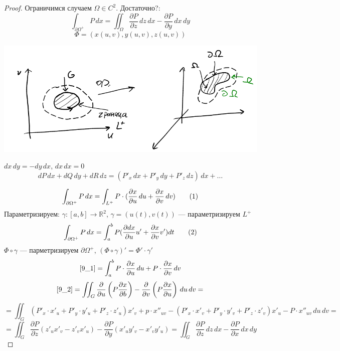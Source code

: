 \documentclass[oneside]{book}
\newcommand\addtag{\refstepcounter{equation}\tag{\theequation}}
\newcommand{\R}{\mathbb{R}}
\theoremstyle{plain}
\theoremstyle{remark}
\theoremstyle{definition}
\begin{document}
\begin{proof}
Ограничимся случаем \(\Omega \in C^2\). Достаточно?:
\[ \int_{\partial \Omega^+} P\,dx = \iint_\Omega\frac{\partial P}{\partial z}\,dz\,dx  - \frac{\partial P}{\partial y}\,dx\,dy \]
\[ \Phi = (x(u, v), y(u, v), z(u, v)) \]
\begin{center}
\includegraphics[scale=0.5]{9_3.png}
\end{center}
\color{blue}
\(dx\,dy = - dy\,dx\), \(dx\,dx = 0\)
\[ dP\,dx + dQ\,dy + dR\,dz = (P'_x\,dx + P'_y\,dy + P'_z\,dz)\,dx + \dots \]

\color{black}
\[ \int_{\partial \Omega^+} P\,dx = \int_{L^+} P\cdot (\frac{\partial x}{\partial u}\,du + \frac{\partial x}{\partial v}\,dv) \addtag\label{9_2} \]
\color{blue}
Параметризируем: \(\gamma: [a, b] \to \R^2\), \(\gamma = (u(t), v(t))\) --- параметризируем \(L^+\)
\[ \int_{\partial \Omega^+} P\,dx = \int_a^b P(\frac{\partial dx}{\partial u}u' + \frac{\partial x}{\partial v}v')dt \addtag\label{9_1}\]
\(\Phi \circ \gamma\) --- парметризируем \(\partial \Omega^+\), \((\Phi \circ \gamma)' = \Phi' \cdot \gamma'\)
\[ \ref{9_1} = \int_a^b P\cdot\frac{\partial x}{\partial u}\,du + P \cdot \frac{\partial x}{\partial v}\,dv \]
\color{black}
\[ \ref{9_2} = \iint_G \frac{\partial}{\partial u}\left(P\frac{\partial x}{\partial b}\right) - \frac{\partial}{\partial v} \left(P \frac{\partial x}{\partial u}\right)\,du\,dv = \]
\[ = \iint_G (P'_x\cdot x'_u + P'_y\cdot y'_u + P'_z\cdot z'_u)x'_v + p\cdot x''_{uv} - (P'_x\cdot x'_v + P'_y\cdot y'_v + P'_z\cdot z'_v)x'_u - P\cdot x''_{uv} \,du\,dv = \]
\[ = \iint_G \frac{\partial P}{\partial z} (z'_ux'_v - z'_vx'_u) - \frac{\partial P}{\partial y}(x'_uy'_v - x'_vy'_u) = \iint_G \frac{\partial P}{\partial z}\,dz\,dx - \frac{\partial P}{\partial x}\,dx\,dy\]
\end{proof}
\end{document}
